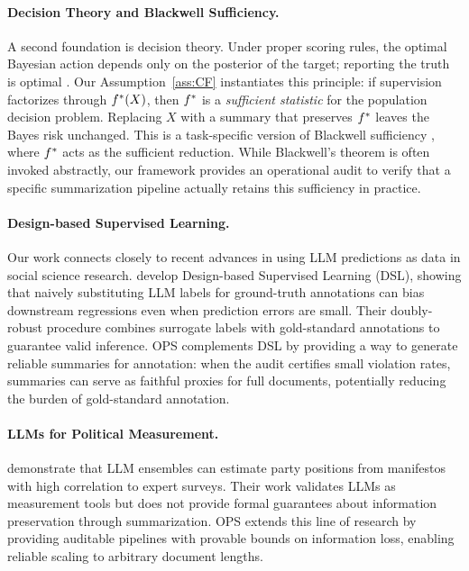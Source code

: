 \paragraph{Decision Theory and Blackwell Sufficiency.}
A second foundation is decision theory. Under proper scoring rules, the optimal Bayesian action depends only on the posterior of the target; reporting the truth is optimal \citep{GneitingRaftery2007,Dawid2007}. Our Assumption~\ref{ass:CF} instantiates this principle: if supervision factorizes through $f^{\ast}(X)$, then $f^{\ast}$ is a \emph{sufficient statistic} for the population decision problem. Replacing $X$ with a summary that preserves $f^{\ast}$ leaves the Bayes risk unchanged. This is a task-specific version of Blackwell sufficiency \citep{Blackwell1953,Torgersen1991}, where $f^{\ast}$ acts as the sufficient reduction. While Blackwell's theorem is often invoked abstractly, our framework provides an operational audit to verify that a specific summarization pipeline actually retains this sufficiency in practice.

\paragraph{Design-based Supervised Learning.}
Our work connects closely to recent advances in using LLM predictions as data in social science research. \citet{EgamiEtAl2024} develop Design-based Supervised Learning (DSL), showing that naively substituting LLM labels for ground-truth annotations can bias downstream regressions even when prediction errors are small. Their doubly-robust procedure combines surrogate labels with gold-standard annotations to guarantee valid inference. OPS complements DSL by providing a way to generate reliable summaries for annotation: when the audit certifies small violation rates, summaries can serve as faithful proxies for full documents, potentially reducing the burden of gold-standard annotation.

\paragraph{LLMs for Political Measurement.}
\citet{BenoitEtAl2025} demonstrate that LLM ensembles can estimate party positions from manifestos with high correlation to expert surveys. Their work validates LLMs as measurement tools but does not provide formal guarantees about information preservation through summarization. OPS extends this line of research by providing auditable pipelines with provable bounds on information loss, enabling reliable scaling to arbitrary document lengths.

